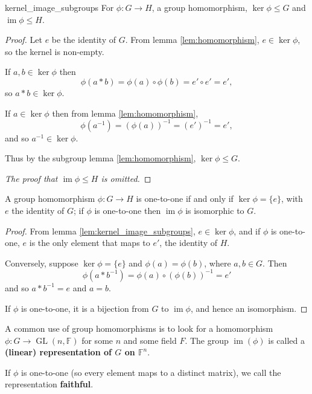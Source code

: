 \begin{lemma}{\cite{math2601_notes}}{kernel_image_subgroups}
For $\phi : G \to H$, a group homomorphism, $\ker \phi \leq G$ and $\operatorname{im} \phi \leq H$.

\begin{proof}
Let $e$ be the identity of $G$. From lemma \ref{lem:homomorphism}, $e \in \ker \phi$, so the kernel is non-empty.

If $a, b \in \ker \phi$ then
$$ \phi (a * b) = \phi (a) \circ \phi (b) = e' \circ e' = e' , $$
so $a * b \in \ker \phi$.

If $a \in \ker \phi$ then from lemma \ref{lem:homomorphism},
$$ \phi (a^{-1}) = (\phi (a))^{-1} = (e')^{-1} = e' , $$
and so $a^{-1} \in \ker \phi$.

Thus by the subgroup lemma \ref{lem:homomorphism}, $\ker \phi \leq G$.

\textit{The proof that $\operatorname{im} \phi \leq H$ is omitted.}
\end{proof}
\end{lemma}

\begin{lemma}{\cite{math2601_notes}}{}
A group homomorphism $\phi : G \to H$ is one-to-one if and only if $\ker \phi = \{e\}$, with $e$ the identity of $G$; if $\phi$ is one-to-one then $\operatorname{im} \phi$ is isomorphic to $G$.

\begin{proof}
From lemma \ref{lem:kernel_image_subgroups}, $e \in \ker \phi$, and if $\phi$ is one-to-one, $e$ is the only element that maps to $e'$, the identity of $H$.

Conversely, suppose $\ker \phi = \{e\}$ and $\phi (a) = \phi (b)$, where $a, b \in G$. Then
$$ \phi (a * b^{-1}) = \phi (a) \circ (\phi (b))^{-1} = e' $$
and so $a * b^{-1} = e$ and $a = b$.

If $\phi$ is one-to-one, it is a bijection from $G$ to $\operatorname{im} \phi$, and hence an isomorphism.
\end{proof}
\end{lemma}

A common use of group homomorphisms is to look for a homomorphism $\phi : G \to \operatorname{GL}(n, \mathbb{F})$ for some $n$ and some field $F$. The group $\operatorname{im} (\phi)$ is called a \textbf{(linear) representation of $G$ on $\mathbb{F}^n$}.

If $\phi$ is one-to-one (so every element maps to a distinct matrix), we call the representation \textbf{faithful}.


